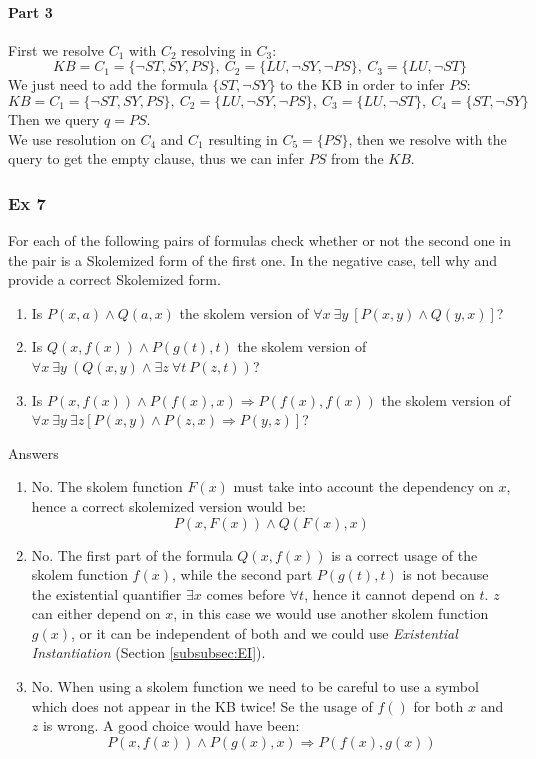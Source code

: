 \documentclass[10pt,a4paper]{article}
\begin{document}
\begin{itemize}
\paragraph{Part 3}
First we resolve $C_1$ with $C_2$ resolving in $C_3$:
\[KB=C_1=\lbrace \neg ST, SY, PS \rbrace,\ C_2=\lbrace LU, \neg SY, \neg PS \rbrace,\ C_3=\lbrace LU, \neg ST \rbrace\]
We just need to add the formula $\lbrace ST ,\neg SY \rbrace$  to the KB in order to infer $PS$:
\[KB=C_1=\lbrace \neg ST, SY, PS \rbrace,\ C_2=\lbrace LU, \neg SY, \neg PS \rbrace,\ C_3=\lbrace LU, \neg ST \rbrace,\ C_4=\lbrace ST, \neg SY\rbrace\]
Then we query $q=PS$.\\
We use resolution on $C_4$ and $C_1$ resulting in $C_5=\lbrace PS \rbrace$, then we resolve with the query to get the empty clause, thus we can infer $PS$ from the $KB$.


\subsubsection{Ex 7}
For each of the following pairs of formulas check whether or not the second one in the pair is a Skolemized form of the first one. In the negative case, tell why and provide a correct Skolemized form.

\begin{enumerate}


\item Is $ P(x,a)\wedge Q(a,x)$ the skolem version of $\forall x\ \exists y\ [P(x,y)\wedge Q(y,x)]$?
\item Is $ Q(x,f(x))\wedge P(g(t),t)$ the skolem version of $\forall x\ \exists y\ (Q(x,y)\wedge \exists z\ \forall t\ P(z,t))$?
\item Is $P(x,f(x))\wedge P(f(x),x)\Rightarrow P(f(x),f(x))$ the skolem version of $\forall x\ \exists y\  \exists z[P(x,y)\wedge P(z,x)\Rightarrow P(y,z)]$?
\end{enumerate}
Answers
\begin{enumerate}
\item No. The skolem function $F(x)$ must take into account the dependency on $x$, hence a correct skolemized version would be:
\[P(x,F(x))\wedge Q(F(x),x)\]
\item No. The first part of the formula $Q(x,f(x))$ is a correct usage of the skolem function $f(x)$, while the second part $P(g(t),t)$ is not because the existential quantifier  $\exists x$ comes before $\forall t$, hence it cannot depend on $t$. $z$ can either depend on $x$, in this case we would use another skolem function $g(x)$, or it can be independent of both and we could use \textit{Existential Instantiation} (Section \ref{subsubsec:EI}). 
\item No. When using a skolem function we need to be careful to use a symbol which does not appear in the KB twice! Se the usage of $f()$ for both $x$ and $z$ is wrong. A good choice would have been:
\[P(x,f(x))\wedge P(g(x),x)\Rightarrow P(f(x),g(x))\]



\end{enumerate}
\end{itemize}
\end{document}
